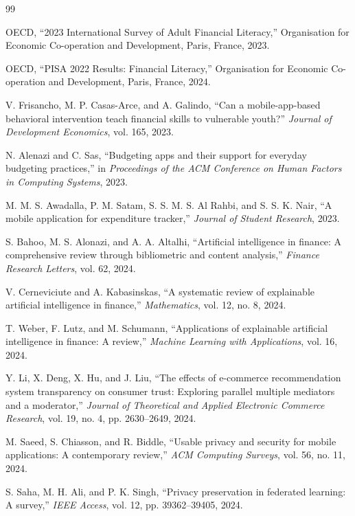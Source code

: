 \documentclass[12pt,a4paper]{report}
\begin{document}
\begin{thebibliography}{99}

OECD,
``2023 International Survey of Adult Financial Literacy,''
Organisation for Economic Co-operation and Development,
Paris,
France,
2023.

OECD,
``PISA 2022 Results:
Financial Literacy,''
Organisation for Economic Co-operation and Development,
Paris,
France,
2024.

V. Frisancho,
M. P. Casas-Arce,
and A. Galindo,
``Can a mobile-app-based behavioral intervention teach financial skills to vulnerable youth?''
\textit{Journal of Development Economics},
vol. 165,
2023.

N. Alenazi and C. Sas,
``Budgeting apps and their support for everyday budgeting practices,''
in \textit{Proceedings of the ACM Conference on Human Factors in Computing Systems},
2023.

M. M. S. Awadalla,
P. M. Satam,
S. S. M. S. Al Rahbi,
and S. S. K. Nair,
``A mobile application for expenditure tracker,''
\textit{Journal of Student Research},
2023.

S. Bahoo,
M. S. Alonazi,
and A. A. Altalhi,
``Artificial intelligence in finance:
A comprehensive review through bibliometric and content analysis,''
\textit{Finance Research Letters},
vol. 62,
2024.

V. Cerneviciute and A. Kabasinskas,
``A systematic review of explainable artificial intelligence in finance,''
\textit{Mathematics},
vol. 12,
no. 8,
2024.

T. Weber,
F. Lutz,
and M. Schumann,
``Applications of explainable artificial intelligence in finance:
A review,''
\textit{Machine Learning with Applications},
vol. 16,
2024.

Y. Li,
X. Deng,
X. Hu,
and J. Liu,
``The effects of e-commerce recommendation system transparency on consumer trust:
Exploring parallel multiple mediators and a moderator,''
\textit{Journal of Theoretical and Applied Electronic Commerce Research},
vol. 19,
no. 4,
pp. 2630--2649,
2024.

M. Saeed,
S. Chiasson,
and R. Biddle,
``Usable privacy and security for mobile applications:
A contemporary review,''
\textit{ACM Computing Surveys},
vol. 56,
no. 11,
2024.

S. Saha,
M. H. Ali,
and P. K. Singh,
``Privacy preservation in federated learning:
A survey,''
\textit{IEEE Access},
vol. 12,
pp. 39362--39405,
2024.


\end{thebibliography}
\end{document}
